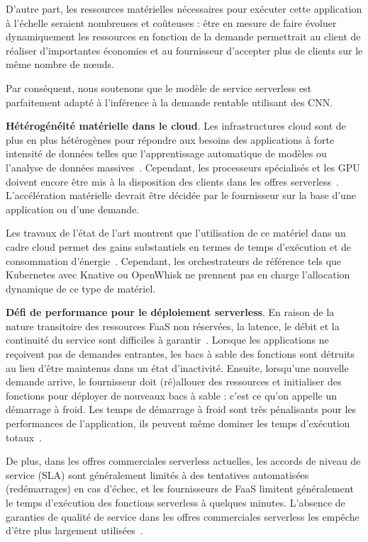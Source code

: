 D'autre part, les ressources matérielles nécessaires pour exécuter cette application à l'échelle seraient nombreuses et coûteuses : être en mesure de faire évoluer dynamiquement les ressources en fonction de la demande permettrait au client de réaliser d'importantes économies et au fournisseur d'accepter plus de clients sur le même nombre de nœuds.

Par conséquent, nous soutenons que le modèle de service serverless est parfaitement adapté à l'inférence à la demande rentable utilisant des CNN.

\textbf{Hétérogénéité matérielle dans le cloud}. Les infrastructures cloud sont de plus en plus hétérogènes pour répondre aux besoins des applications à forte intensité de données telles que l'apprentissage automatique de modèles ou l'analyse de données massives~\cite{reissHeterogeneityDynamicityClouds}. Cependant, les processeurs spécialisés et les GPU doivent encore être mis à la disposition des clients dans les offres serverless~\cite{khandelwalTaureauDeconstructingServerless2020}. L'accélération matérielle devrait être décidée par le fournisseur sur la base d'une application ou d'une demande.

Les travaux de l'état de l'art montrent que l'utilisation de ce matériel dans un cadre cloud permet des gains substantiels en termes de temps d'exécution et de consommation d'énergie~\cite{10.1145/3369583.3392679, 9195730}. Cependant, les orchestrateurs de référence tels que Kubernetes avec Knative ou OpenWhisk ne prennent pas en charge l'allocation dynamique de ce type de matériel.

\textbf{Défi de performance pour le déploiement serverless}. En raison de la nature transitoire des ressources FaaS non réservées, la latence, le débit et la continuité du service sont difficiles à garantir~\cite{vaneykSPECRGCloud2018, dartoisCuckooOpportunisticMapReduce2019}. Lorsque les applications ne reçoivent pas de demandes entrantes, les bacs à sable des fonctions sont détruits au lieu d'être maintenus dans un état d'inactivité. Ensuite, lorsqu'une nouvelle demande arrive, le fournisseur doit (ré)allouer des ressources et initialiser des fonctions pour déployer de nouveaux bacs à sable : c'est ce qu'on appelle un démarrage à froid. Les temps de démarrage à froid sont très pénalisants pour les performances de l'application, ils peuvent même dominer les temps d'exécution totaux~\cite{mullerLambadaInteractiveData2020}.

De plus, dans les offres commerciales serverless actuelles, les accords de niveau de service (SLA) sont généralement limités à des tentatives automatisées (redémarrages) en cas d'échec, et les fournisseurs de FaaS limitent généralement le temps d'exécution des fonctions serverless à quelques minutes. L'absence de garanties de qualité de service dans les offres commerciales serverless les empêche d'être plus largement utilisées~\cite{buyyaSLAorientedResourceProvisioning2011}.


